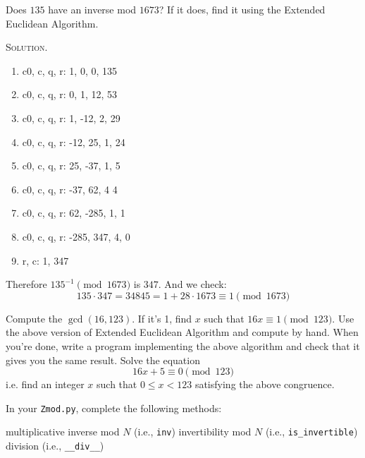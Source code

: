 \begin{eg}
Does $135$ have an inverse mod $1673$?
If it does, find it using the Extended Euclidean Algorithm.
\end{eg}
\textsc{Solution}.
\begin{enumerate}[nosep]
  \item c0, c, q, r: 1, 0, 0, 135
  \item c0, c, q, r: 0, 1, 12, 53
  \item c0, c, q, r: 1, -12, 2, 29
  \item c0, c, q, r: -12, 25, 1, 24
  \item c0, c, q, r: 25, -37, 1, 5
  \item c0, c, q, r: -37, 62, 4 4
  \item c0, c, q, r: 62, -285, 1, 1
  \item c0, c, q, r: -285, 347, 4, 0
  \item r, c: 1, 347
\end{enumerate}
Therefore $135^{-1} \pmod{1673}$ is $347$.
And we check:
\[
135 \cdot 347 = 34845 = 1 + 28 \cdot 1673 \equiv 1 \pmod{1673}  
\]


\begin{ex}
Compute the $\gcd(16, 123)$.
If it's 1, find $x$ such that $16x \equiv 1 \pmod{123}$.
Use the above version of Extended Euclidean Algorithm and compute by hand.
When you're done, write a program implementing the above algorithm
and check that it gives you the same result.
Solve the equation
\[
16x + 5 \equiv 0 \pmod{123}
\]
i.e. find an integer $x$ such that $0 \leq x < 123$ satisfying the
above congruence.
\end{ex}


\begin{ex}
  In your \verb!Zmod.py!, complete the following methods:
  \begin{enumerate}[nosep]
    \li multiplicative inverse mod $N$ (i.e., \texttt{inv})
    \li invertibility mod $N$ (i.e., \texttt{is\_invertible})
    \li division (i.e., \texttt{\_\_div\_\_})
  \end{enumerate}
\end{ex}


